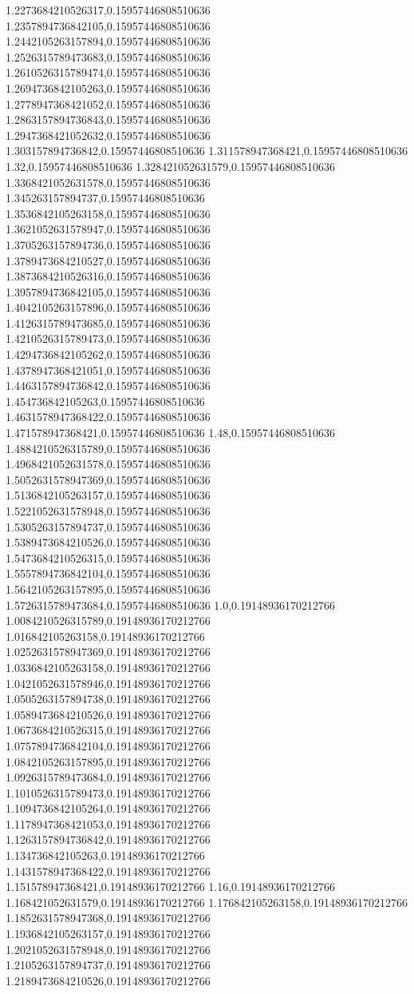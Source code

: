 1.2273684210526317,0.15957446808510636
1.2357894736842105,0.15957446808510636
1.2442105263157894,0.15957446808510636
1.2526315789473683,0.15957446808510636
1.2610526315789474,0.15957446808510636
1.2694736842105263,0.15957446808510636
1.2778947368421052,0.15957446808510636
1.2863157894736843,0.15957446808510636
1.2947368421052632,0.15957446808510636
1.303157894736842,0.15957446808510636
1.311578947368421,0.15957446808510636
1.32,0.15957446808510636
1.328421052631579,0.15957446808510636
1.3368421052631578,0.15957446808510636
1.345263157894737,0.15957446808510636
1.3536842105263158,0.15957446808510636
1.3621052631578947,0.15957446808510636
1.3705263157894736,0.15957446808510636
1.3789473684210527,0.15957446808510636
1.3873684210526316,0.15957446808510636
1.3957894736842105,0.15957446808510636
1.4042105263157896,0.15957446808510636
1.4126315789473685,0.15957446808510636
1.4210526315789473,0.15957446808510636
1.4294736842105262,0.15957446808510636
1.4378947368421051,0.15957446808510636
1.4463157894736842,0.15957446808510636
1.454736842105263,0.15957446808510636
1.4631578947368422,0.15957446808510636
1.471578947368421,0.15957446808510636
1.48,0.15957446808510636
1.4884210526315789,0.15957446808510636
1.4968421052631578,0.15957446808510636
1.5052631578947369,0.15957446808510636
1.5136842105263157,0.15957446808510636
1.5221052631578948,0.15957446808510636
1.5305263157894737,0.15957446808510636
1.5389473684210526,0.15957446808510636
1.5473684210526315,0.15957446808510636
1.5557894736842104,0.15957446808510636
1.5642105263157895,0.15957446808510636
1.5726315789473684,0.15957446808510636
1.0,0.19148936170212766
1.0084210526315789,0.19148936170212766
1.016842105263158,0.19148936170212766
1.0252631578947369,0.19148936170212766
1.0336842105263158,0.19148936170212766
1.0421052631578946,0.19148936170212766
1.0505263157894738,0.19148936170212766
1.0589473684210526,0.19148936170212766
1.0673684210526315,0.19148936170212766
1.0757894736842104,0.19148936170212766
1.0842105263157895,0.19148936170212766
1.0926315789473684,0.19148936170212766
1.1010526315789473,0.19148936170212766
1.1094736842105264,0.19148936170212766
1.1178947368421053,0.19148936170212766
1.1263157894736842,0.19148936170212766
1.134736842105263,0.19148936170212766
1.1431578947368422,0.19148936170212766
1.151578947368421,0.19148936170212766
1.16,0.19148936170212766
1.168421052631579,0.19148936170212766
1.176842105263158,0.19148936170212766
1.1852631578947368,0.19148936170212766
1.1936842105263157,0.19148936170212766
1.2021052631578948,0.19148936170212766
1.2105263157894737,0.19148936170212766
1.2189473684210526,0.19148936170212766

